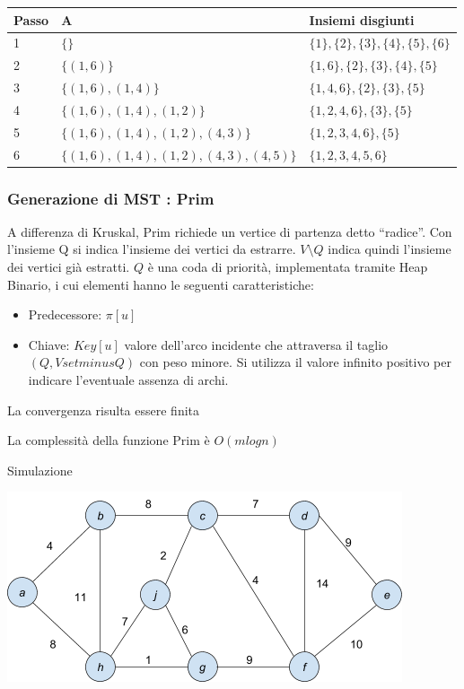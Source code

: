 \documentclass[tikz]{article}
\providecommand{\tightlist}{%
  \setlength{\itemsep}{0pt}\setlength{\parskip}{0pt}}
\begin{document}
{{\begin{tabular}{|l|l|l|}
\hline 
Passo & A & Insiemi disgiunti \\ 
\hline 
1 & $\{\}$ & $\{1\},\{2\},\{3\},\{4\},\{5\},\{6\}$ \\ 
\hline 
2 & $\{(1,6)\}$ & $\{1,6\},\{2\},\{3\},\{4\},\{5\}$ \\ 
\hline 
3 & $\{(1,6),(1,4)\}$ & $\{1,4,6\},\{2\},\{3\},\{5\}$ \\ 
\hline 
4 & $\{(1,6),(1,4),(1,2)\}$ & $\{1,2,4,6\},\{3\},\{5\}$ \\ 
\hline 
5 & $\{(1,6),(1,4),(1,2),(4,3)\}$ & $\{1,2,3,4,6\},\{5\}$ \\ 
\hline 
6 & $\{(1,6),(1,4),(1,2),(4,3),(4,5)\}$ & $\{1,2,3,4,5,6\}$ \\ 
\hline 
\end{tabular} 

\subsubsection{Generazione di MST : Prim}

{A differenza di Kruskal, Prim richiede un vertice di partenza detto ``radice''. Con l'insieme Q si indica l'insieme dei vertici da estrarre.
$V\setminus Q$ indica quindi l'insieme dei vertici già estratti. $Q$ è una coda di priorità, implementata tramite Heap Binario, i cui elementi hanno le seguenti caratteristiche:}

\begin{itemize}
\tightlist
\item
  Predecessore: $\pi[u]$
\item
Chiave: $Key[u]$ valore dell'arco incidente che attraversa il taglio $(Q,Vsetminus Q)$ con peso minore. Si utilizza il valore infinito positivo per indicare l'eventuale assenza di archi.
\end{itemize}



La convergenza risulta essere finita

La complessità della funzione Prim è $O(m logn)$

{Simulazione}

{\includegraphics{images/image542.png}}

}}
\end{document}
